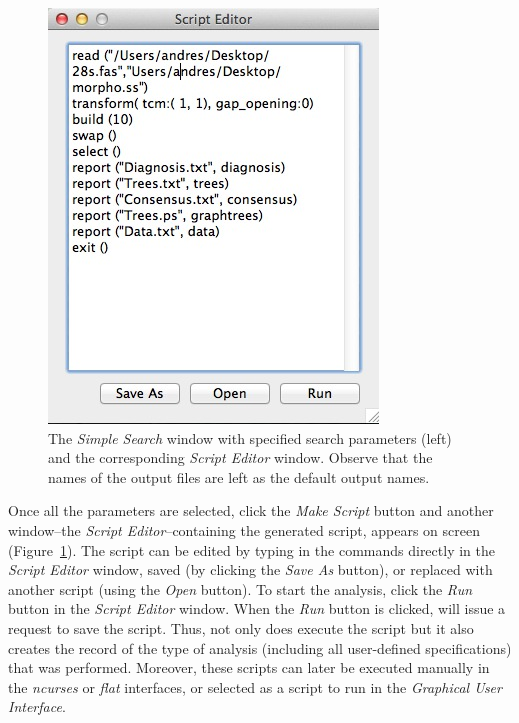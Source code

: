 \begin{figure}
\begin{minipage}[c]{0.52\textwidth}
\includegraphics[width=\textwidth]{doc/figures/simplesearch_script.jpg}
\end{minipage}

\caption{The \emph{Simple Search} window with specified search 
parameters (left) and the corresponding \emph{Script Editor} window. 
Observe that the names of the output files are left as the default output names.}
\label{fig:ScriptEditor_Window}
\end{figure}

Once all the parameters are selected, click the \emph{Make Script} button 
and another window--the \emph{Script Editor}--containing the generated 
script, appears on screen (Figure~\ref{fig:ScriptEditor_Window}). 
The script can be edited by typing in the commands directly in the 
\emph{Script Editor} window, saved (by clicking the \emph{Save As} 
button), or replaced with another script (using the \emph{Open} button). 
To start the analysis, click the \emph{Run} button in the \emph{Script 
Editor} window. When the \emph{Run} button is clicked, \poy will issue a
request to save the script. Thus, not only does \poy execute the script but
it also creates the record of the type of analysis (including all user-defined 
specifications) that was performed. Moreover, these scripts can later be 
executed manually in the \emph{ncurses} or \emph{flat} interfaces, or
selected as a script to run in the \emph{Graphical User Interface}.

